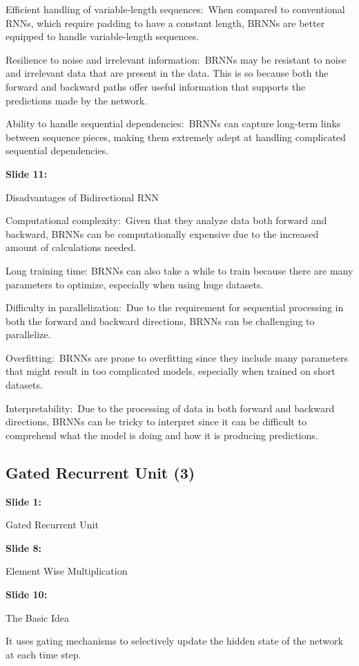 \documentclass[11pt,a4paper]{article}
\begin{document}
Efficient handling of variable-length sequences: When compared to conventional RNNs, which require padding to have a constant length, BRNNs are better equipped to handle variable-length sequences.

Resilience to noise and irrelevant information: BRNNs may be resistant to noise and irrelevant data that are present in the data. This is so because both the forward and backward paths offer useful information that supports the predictions made by the network.

Ability to handle sequential dependencies: BRNNs can capture long-term links between sequence pieces, making them extremely adept at handling complicated sequential dependencies.

\textbf{Slide 11:}

Disadvantages of Bidirectional RNN

Computational complexity: Given that they analyze data both forward and backward, BRNNs can be computationally expensive due to the increased amount of calculations needed.

Long training time: BRNNs can also take a while to train because there are many parameters to optimize, especially when using huge datasets.

Difficulty in parallelization: Due to the requirement for sequential processing in both the forward and backward directions, BRNNs can be challenging to parallelize.

Overfitting: BRNNs are prone to overfitting since they include many parameters that might result in too complicated models, especially when trained on short datasets.

Interpretability: Due to the processing of data in both forward and backward directions, BRNNs can be tricky to interpret since it can be difficult to comprehend what the model is doing and how it is producing predictions.


\subsection{Gated Recurrent Unit (3)}

\textbf{Slide 1:}

Gated Recurrent Unit

\textbf{Slide 8:}

Element Wise Multiplication

\textbf{Slide 10:}

The Basic Idea

It uses gating mechanisms to selectively update the hidden state of the network at each time step.
\end{document}
